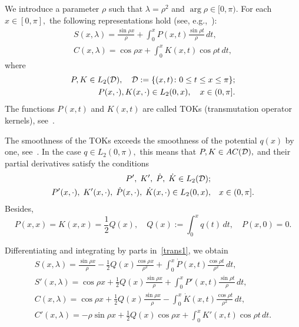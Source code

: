 \documentclass[a4paper, 12pt] {article}
\theoremstyle{plain}
\theoremstyle{remark}
\theoremstyle{plain}
\theoremstyle{definition}
\numberwithin{equation}{section}
\begin{document}
We introduce a parameter $\rho$ such that $\lambda = \rho^2$ and $\arg \rho \in [0, \pi).$
For each $x \in [0, \pi],$ the following representations hold (see, e.g.,~\cite{march,freil}):
\begin{equation} \label{trans1}
\begin{split}
S(x, \lambda) = \frac{\sin \rho x}{\rho} +\int_0^x P(x, t) \frac{\sin \rho t}{\rho} \, dt,
\\
C(x, \lambda) =\cos \rho x +\int_0^x K(x, t) \cos \rho t \, dt,
\end{split}
\end{equation}
where
\begin{equation*}
\begin{split}
P, K \in L_2({\cal D}), \quad {\cal D} := \{ (x, t) \colon 0 \le t \le x \le \pi \};\\
P(x, \cdot), K(x, \cdot) \in L_2(0, x), \quad x \in (0, \pi].
\end{split}
\end{equation*}
The functions $P(x, t)$ and $K(x, t)$ are called TOKs (transmutation operator kernels), see~\cite{sitnik, march, freil}.

The smoothness of the TOKs exceeds the smoothness of the potential $q(x)$ by one, see~\cite{freil, march}. In the case $q \in L_2(0, \pi),$ this means that $P, K \in AC({\cal D}),$ and their partial derivatives satisfy the conditions
\begin{equation*}
\begin{split}
P', \; K', \; \dot{P}, \; \dot{K} \in L_2({\cal D});& \\
P'(x, \cdot), \; K'(x, \cdot), \; \dot{P}(x, \cdot), \; \dot{K}(x, \cdot) \in L_2(0, x),& \quad x \in (0, \pi].
\end{split}
\end{equation*}
Besides,
\begin{equation*}
P(x, x) = K(x, x) = \frac12Q(x), \quad Q(x) := \int_0^x q(t) \, dt, \quad P(x, 0) = 0.
\end{equation*}

Differentiating and integrating by parts in~\eqref{trans1}, we obtain
\begin{equation} \label{0}
\begin{split}
S(x, \lambda) = \frac{\sin \rho x}{\rho} - \frac12Q(x) \frac{\cos \rho x}{\rho^2} +\int_0^x \dot P(x, t) \frac{\cos \rho t}{\rho^2} \, dt,
\\
S'(x, \lambda) = \cos \rho x + \frac12Q(x) \frac{\sin \rho x}{\rho} + \int_0^x  P'(x, t) \frac{\sin \rho t}{\rho} \, dt,
\\
C(x, \lambda) =\cos \rho x + \frac12Q(x) \frac{\sin \rho x}{\rho} - \int_0^x \dot K(x, t) \frac{\cos \rho t}{\rho^2} \, dt,
\\
C'(x, \lambda) =-\rho\sin \rho x + \frac12Q(x) \cos \rho x + \int_0^x  K'(x, t) \cos \rho t \, dt.
\end{split}
\end{equation}
\end{document}
